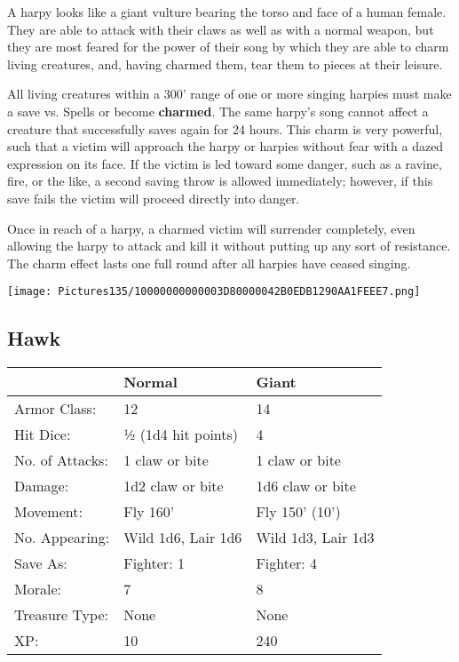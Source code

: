 \documentclass[a4paper,twoside,openany,10pt]{book}
\begin{document}
\begin{multicols}{2}
A harpy looks like a giant vulture bearing the torso and face of a human female. They are able to attack with their claws as well as with a normal weapon, but they are most feared for the power of their song by which they are able to charm living creatures, and, having charmed them, tear them to pieces at their leisure.

All living creatures within a 300' range of one or more singing harpies must make a save vs. Spells or become \textbf{charmed}. The same harpy's song cannot affect a creature that successfully saves again for 24 hours. This charm is very powerful, such that a victim will approach the harpy or harpies without fear with a dazed expression on its face. If the victim is led toward some danger, such as a ravine, fire, or the like, a second saving throw is allowed immediately; however, if this save fails the victim will proceed directly into danger.

Once in reach of a harpy, a charmed victim will surrender completely, even allowing the harpy to attack and kill it without putting up any sort of resistance. The charm effect lasts one full round after all harpies have ceased singing.

\begin{center}
	\texttt{[image: Pictures135/10000000000003D80000042B0EDB1290AA1FEEE7.png]}
\end{center}

\subsection*{Hawk}\label{hawk}

\begin{tabularx}{0.48\textwidth}{@{}llX@{}}
& Normal & Giant \\\hline
Armor Class: & 12 & 14 \\\hline
Hit Dice: & ½ (1d4 hit points) & 4 \\\hline
No. of Attacks: & 1 claw or bite & 1 claw or bite \\\hline
Damage: & 1d2 claw or bite & 1d6 claw or bite \\\hline
Movement: & Fly 160' & Fly 150'
(10') \\\hline
No. Appearing: & Wild 1d6, Lair 1d6 & Wild 1d3, Lair 1d3 \\\hline
Save As: & Fighter: 1 & Fighter: 4 \\\hline
Morale: & 7 & 8 \\\hline
Treasure Type: & None & None \\\hline
XP: & 10 & 240 \\\hline
\end{tabularx}\medskip


\end{multicols}
\end{document}
